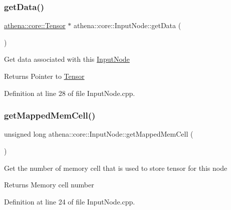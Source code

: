 \subsubsection{\texorpdfstring{get\+Data()}{getData()}}
{\footnotesize\ttfamily \mbox{\hyperlink{classathena_1_1core_1_1_tensor}{athena\+::core\+::\+Tensor}} $\ast$ athena\+::core\+::\+Input\+Node\+::get\+Data (\begin{DoxyParamCaption}{ }\end{DoxyParamCaption})}

Get data associated with this \mbox{\hyperlink{classathena_1_1core_1_1_input_node}{Input\+Node}} \begin{DoxyReturn}{Returns}
Pointer to \mbox{\hyperlink{classathena_1_1core_1_1_tensor}{Tensor}} 
\end{DoxyReturn}


Definition at line 28 of file Input\+Node.\+cpp.

\mbox{\label{classathena_1_1core_1_1_input_node_acebc0cbf077eaae99f5c11cfba608533}} 
\subsubsection{\texorpdfstring{get\+Mapped\+Mem\+Cell()}{getMappedMemCell()}}
{\footnotesize\ttfamily unsigned long athena\+::core\+::\+Input\+Node\+::get\+Mapped\+Mem\+Cell (\begin{DoxyParamCaption}{ }\end{DoxyParamCaption})}

Get the number of memory cell that is used to store tensor for this node \begin{DoxyReturn}{Returns}
Memory cell number 
\end{DoxyReturn}


Definition at line 24 of file Input\+Node.\+cpp.

\mbox{\label{classathena_1_1core_1_1_input_node_a4be7482bcf2e56ea3fd03a2bf79be074}} 
